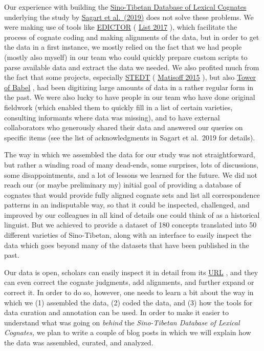 \documentclass[
  a4paper,
  14pt,
  oneside,
  tablecaptionabove
]{scrbook}
\begin{document}
Our experience with building the
\href{https://dighl.github.io/sinotibetan}{Sino-Tibetan Database of
Lexical Cognates} underlying the study by
\href{http://bibliography.lingpy.org?key=Sagart2019}{Sagart et
al.~(2019)} does not solve these problems. We were making use of tools
like \href{http://tsv.lingpy.org}{EDICTOR} (
\href{http://bibliography.lingpy.org?key=List2017d}{List 2017} ), which
facilitate the process of cognate coding and making alignments of the
data, but in order to get the data in a first instance, we mostly relied
on the fact that we had people (mostly also myself) in our team who
could quickly prepare custom scripts to parse available data and extract
the data we needed. We also profited much from the fact that some
projects, especially \href{http://stedt.berkeley.edu/}{STEDT} (
\href{http://bibliography.lingpy.org?key=Matisoff2015}{Matisoff 2015} ),
but also \href{http://starling.rinet.ru/}{Tower of Babel} , had been
digitizing large amounts of data in a rather regular form in the past.
We were also lucky to have people in our team who have done original
fieldwork (which enabled them to quickly fill in a list of certain
varieties, consulting informants where data was missing), and to have
external collaborators who generously shared their data and answered our
queries on specific items (see the list of acknowledgments in Sagart et
al.~2019 for details).

The way in which we assembled the data for our study was not
straightforward, but rather a winding road of many dead-ends, some
surprises, lots of discussions, some disappointments, and a lot of
lessons we learned for the future. We did not reach our (or maybe
preliminary my) initial goal of providing a database of cognates that
would provide fully aligned cognate sets and list all correspondence
patterns in an indisputable way, so that it could be inspected,
challenged, and improved by our colleagues in all kind of details one
could think of as a historical linguist. But we achieved to provide a
dataset of 180 concepts translated into 50 different varieties of
Sino-Tibetan, along with an interface to easily inspect the data which
goes beyond many of the datasets that have been published in the past.

Our data is open, scholars can easily inspect it in detail from its
\href{https://dighl.github.org/sinotibetan}{URL} , and they can even
correct the cognate judgments, add alignments, and further expand or
correct it. In order to do so, however, one needs to learn a bit about
the way in which we (1) assembled the data, (2) coded the data, and (3)
how the tools for data curation and annotation can be used. In order to
make it easier to understand what was going on \emph{behind} the
\emph{Sino-Tibetan Database of Lexical Cognates,} we plan to write a
couple of blog posts in which we will explain how the data was
assembled, curated, and analyzed.
\end{document}
